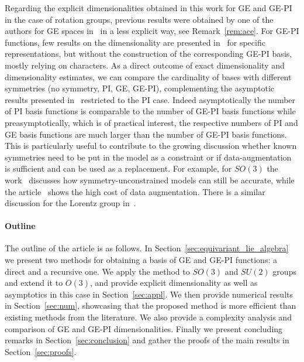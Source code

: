 \documentclass{article}
\numberwithin{equation}{section}
\begin{document}
Regarding the explicit dimensionalities obtained in this work for GE and GE-PI in the case of rotation groups, previous results were obtained by one of the authors for GE spaces in~\cite{Dusson2022-ie} in a less explicit way, see Remark~\ref{rem:ace}. For GE-PI functions, few results on the dimensionality are presented in~\cite{Zhao2005-zx,Talmi2005-gu,Pain2019-ft} for specific representations, but without the construction of the corresponding GE-PI basis, mostly relying on characters.
As a direct outcome of exact dimensionality and dimensionality estimates, we can compare the cardinality
of bases with different symmetries (no symmetry, PI, GE, GE-PI), complementing the asymptotic results presented in~\cite{Bachmayr2024-pv} restricted to the PI case.
Indeed asymptotically the number of PI basis functions is comparable to the number of GE-PI basis functions while preasymptotically, which is of practical interest, the respective numbers of PI and GE basis functions are much larger than the number of GE-PI basis functions.
This is 
particularly useful to contribute to the growing discussion whether known symmetries need to be put in the model as a constraint or if data-augmentation is sufficient and can be used as a replacement. For example, for $SO(3)$ the work~\cite{Bigi2026-yx} discusses how symmetry-unconstrained models can still be accurate, while the article~\cite{Klinteback2026-xg} shows the high cost of data augmentation. There is a similar discussion for the Lorentz group in~\cite{Li2024-bm}.



\paragraph{Outline}

The outline of the article is as follows.
In Section~\ref{sec:equivariant_lie_algebra} we present two methods for obtaining a basis of GE and GE-PI functions: a direct and a recursive one. We apply the method to $SO(3)$ and $SU(2)$ groups and extend it to $O(3)$, and provide explicit dimensionality as well as asymptotics in this case in Section~\ref{sec:appl}. We then provide numerical results in Section~\ref{sec:num}, showcasing that the proposed method is more efficient than existing methods from the literature. 
We also provide a complexity analysis and comparison of GE and GE-PI dimensionalities. 
Finally we present concluding remarks in Section~\ref{sec:conclusion}
and gather the proofs of the main results in Section~\ref{sec:proofs}.
\end{document}
